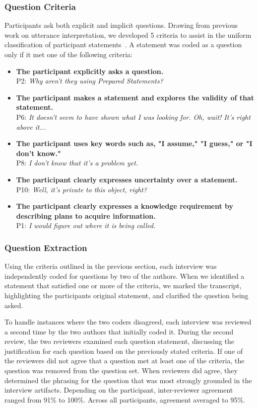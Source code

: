 \documentclass[conference]{IEEEtran}
\begin{document}
\subsubsection{Question Criteria}
Participants ask both explicit and implicit questions. 
Drawing from previous work on utterance interpretation, we developed 5 criteria to assist in the uniform classification of participant statements~\cite{letovsky1987cognitive}. 
A statement was coded as a question only if it met one of the following criteria:

\begin{itemize}
\item \textbf{The participant explicitly asks a question.}
\\ P2: \textit{Why aren't they using Prepared Statements?}
\item \textbf{The participant makes a statement and explores the validity of that statement.}
\\ P6: \textit{It doesn't seem to have shown what I was looking for. Oh, wait! It's right above it...}
\item \textbf{The participant uses key words such as, "I assume," "I guess," or "I don't know."}
\\ P8: \textit{I don't know that it's a problem yet.}
\item \textbf{The participant clearly expresses uncertainty over a statement.}
\\ P10: \textit{Well, it's private to this object, right?}
\item \textbf{The participant clearly expresses a knowledge requirement by describing plans to acquire information.}
\\ P1: \textit{I would figure out where it is being called.}

\end{itemize}

\subsubsection{Question Extraction}
Using the criteria outlined in the previous section, each interview was independently coded for questions by two of the authors. 
When we identified a statement that satisfied one or more of the criteria, we marked the transcript, highlighting the participants original statement, and clarified the question being asked.

To handle instances where the two coders disagreed, each interview was reviewed a second time by the two authors that initially coded it.
During the second review, the two reviewers examined each question statement, discussing the justification for each question based on the previously stated criteria.
If one of the reviewers did not agree that a question met at least one of the criteria, the question was removed from the question set. 
When reviewers did agree, they determined the phrasing for the question that was most strongly grounded in the interview artifacts. 
Depending on the participant, inter-reviewer agreement ranged from 91\% to 100\%. Across all participants, agreement averaged to 95\%.
\end{document}
